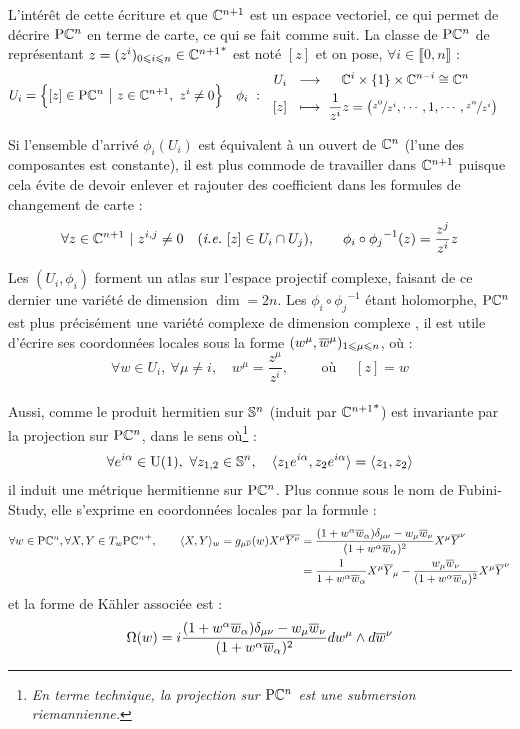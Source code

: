 L'intérêt de cette écriture et que $\C^{n+1}$ est un espace vectoriel, ce qui permet de décrire $\PC{n}$ en terme de carte, ce qui se fait comme suit.
La classe de $\PC{n}$ de représentant $z = (z^i)_{0\leq i\leq n}\in{\C^{n+1}}^*$ est noté $[z]$ et on pose, $\forall i\in\llbracket0,n\rrbracket$ :
\begin{align}
	U_i &= \Big\{[z]\in\PC{n}\ \big|\ z\in \C^{n+1},\ z^i\neq 0\Big\}  &  \phi_i\  :\quad &\begin{aligned}
		U_i\ \ &\lr\quad\ \C^{i}\times \{1\} \times\C^{n-i}\cong \C^{n} \\ [z]\ \ &\lmt\ \frac{1}{z^i}z = \big(\nicefrac{z^0}{z^i},\cdots, 1, \cdots, \nicefrac{z^n}{z^i}\big)
	\end{aligned}
\end{align}
\begin{remarque}
	Si l'ensemble d'arrivé $\phi_i(U_i)$ est équivalent à un ouvert de $\C^{n}$ (l'une des composantes est constante), il est plus commode de travailler dans $\C^{n+1}$ puisque cela évite de devoir enlever et rajouter des coefficient dans les formules de changement de carte :
	\[ \forall z\in\C^{n+1}\ |\ z^{i,j}\neq 0\quad (\ie~[z]\in U_i\cap U_j) ,\qquad \phi_i \circ {\phi_j}^{-1}(z) = \frac{z^j}{z^i}z\]
\end{remarque}
\skipl
Les $(U_i,\phi_i)$ forment un atlas sur l'espace projectif complexe, faisant de ce dernier une variété de dimension $\dim = 2n$. Les $\phi_i \circ {\phi_j}^{-1}$ étant holomorphe, $\PC{n}$ est plus précisément une variété complexe de dimension complexe
, il est utile d'écrire ses coordonnées locales sous la forme $(w^\mu, \congu{w}^\mu)_{1\leq \mu \leq n}$, où :
\[\forall w\in U_i,\ \forall \mu\neq i,\quad w^\mu = \frac{z^\mu}{z^i},\qquad  \text{ où }\quad [z] = w\]
\\

Aussi, comme le produit hermitien sur $\S{n}$ (induit par ${\C^{n+1}}^*$) est invariante par la projection sur $\PC{n}$, dans le sens où\footnote{\itshape
	En terme technique, la projection sur $\PC{n}$ est une submersion riemannienne.} :
\[\forall e^{i\alpha}\in\U{1},\ \forall z_{1,2}\in\S{n},\quad \langle z_1 e^{i\alpha}, z_2 e^{i\alpha} \rangle = \langle z_1 , z_2 \rangle\]
il induit une métrique hermitienne sur $\PC{n}$. Plus connue sous le nom de Fubini-Study, elle s'exprime en coordonnées locales par la formule :
\begin{equation}
	\begin{aligned}
		\forall w\in\PC{n}, \forall X,Y\in\tg[w]{{\PC{n}}^+},\qquad \langle X, Y \rangle_w = g_{\mu\congu{\nu}}(w) X^\mu \congu{Y^\nu} 
		&= \frac{(1+w^\alpha \congu{w}_\alpha)\delta_{\mu\nu} - w_\mu \congu{w}_\nu}{(1+w^\alpha \congu{w}_\alpha)^2}X^\mu \congu{Y}^\nu \\
		&= \frac{1}{1+w^\alpha \congu{w}_\alpha} X^\mu \congu{Y}_\mu - \frac{w_\mu \congu{w}_\nu}{(1+w^\alpha \congu{w}_\alpha)^2} X^\mu \congu{Y}^\nu
	\end{aligned}
\end{equation}
et la forme de Kähler associée est :
\[\Omega(w) = i\frac{(1+w^\alpha \congu{w}_\alpha)\delta_{\mu\nu} - w_\mu \congu{w}_\nu}{(1+w^\alpha \congu{w}_\alpha)^2} dw^\mu \wedge d\congu{w}^\nu\]



